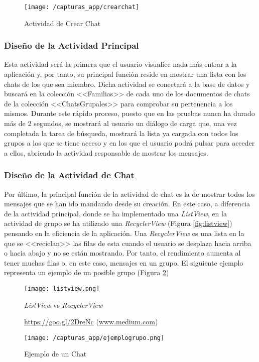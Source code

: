 \begin{figure}[!h]
	\begin{center}
		\texttt{[image: /capturas\_app/crearchat]}
		\caption{Actividad de Crear Chat}
		\label{fig:creargrupo}
	\end{center}
\end{figure}

\newpage

\subsubsection{Diseño de la Actividad Principal}
Esta actividad será la primera que el usuario visualice nada más entrar a la aplicación y, por tanto, su principal función reside en mostrar una lista con los chats de los que sea miembro. Dicha actividad se conectará a la base de datos y buscará en la colección <<Familias>> de cada uno de los documentos de chats de la colección <<ChatsGrupales>> para comprobar su pertenencia a los mismos. Durante este rápido proceso, puesto que en las pruebas nunca ha durado más de 2 segundos, se mostrará al usuario un diálogo de carga que, una vez completada la tarea de búsqueda, mostrará la lista ya cargada con todos los grupos a los que se tiene acceso y en los que el usuario podrá pulsar para acceder a ellos, abriendo la actividad responsable de mostrar los mensajes.

\subsubsection{Diseño de la Actividad de Chat}
Por último, la principal función de la actividad de chat es la de mostrar todos los mensajes que se han ido mandando desde su creación. En este caso, a diferencia de la actividad principal, donde se ha implementado una \textit{ListView}, en la actividad de grupo se ha utilizado una \textit{RecyclerView} (Figura \ref{fig:listview}) pensando en la eficiencia de la aplicación. Una \textit{RecyclerView} es una lista en la que se <<reciclan>> las filas de esta cuando el usuario se desplaza hacia arriba o hacia abajo y no se están mostrando. Por tanto, el rendimiento aumenta al tener muchas filas o, en este caso, mensajes en un grupo. El siguiente ejemplo representa un ejemplo de un posible grupo (Figura \ref{fig:ejemplogrupo}) 

\begin{figure}[!h]
	\centering
	\begin{minipage}{.5\textwidth}
		\centering
		\texttt{[image: listview.png]}
		\caption{\textit{ListView} vs \textit{RecyclerView}}
		\label{fig:listview}{\url{https://goo.gl/2DreNc} (\url{www.medium.com})}
	\end{minipage}%
	\begin{minipage}{.5\textwidth}
		\centering
		\texttt{[image: /capturas\_app/ejemplogrupo.png]}
		\caption{Ejemplo de un Chat}
		\label{fig:ejemplogrupo}
	\end{minipage}
\end{figure}

